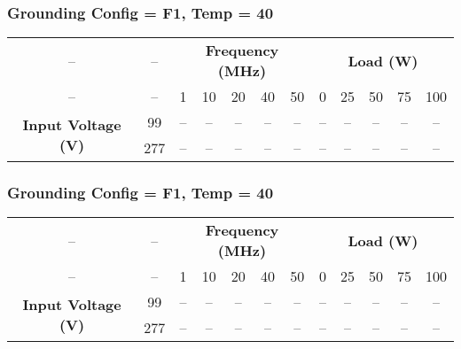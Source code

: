 \vspace{1em}

\subsubsection{Grounding Config = F1, Temp = 40}

\begin{center}
\begin{tabular}{cccccccccccc}
-- & -- & \multicolumn{5}{c}{\textbf{Frequency (MHz)}} & \multicolumn{5}{c}{\textbf{Load (W)}} \\
-- & -- & 1 & 10 & 20 & 40 & 50 & 0 & 25 & 50 & 75 & 100 \\
\midrule
\multirow{2}{*}{\textbf{Input Voltage (V)}} & 99 & -- & -- & -- & -- & -- & -- & -- & -- & -- & -- \\
 & 277 & -- & -- & -- & -- & -- & -- & -- & -- & -- & -- \\
\end{tabular}
\end{center}

\vspace{1em}

\subsubsection{Grounding Config = F1, Temp = 40}

\begin{center}
\begin{tabular}{cccccccccccc}
-- & -- & \multicolumn{5}{c}{\textbf{Frequency (MHz)}} & \multicolumn{5}{c}{\textbf{Load (W)}} \\
-- & -- & 1 & 10 & 20 & 40 & 50 & 0 & 25 & 50 & 75 & 100 \\
\midrule
\multirow{2}{*}{\textbf{Input Voltage (V)}} & 99 & -- & -- & -- & -- & -- & -- & -- & -- & -- & -- \\
 & 277 & -- & -- & -- & -- & -- & -- & -- & -- & -- & -- \\
\end{tabular}
\end{center}

\vspace{1em}
